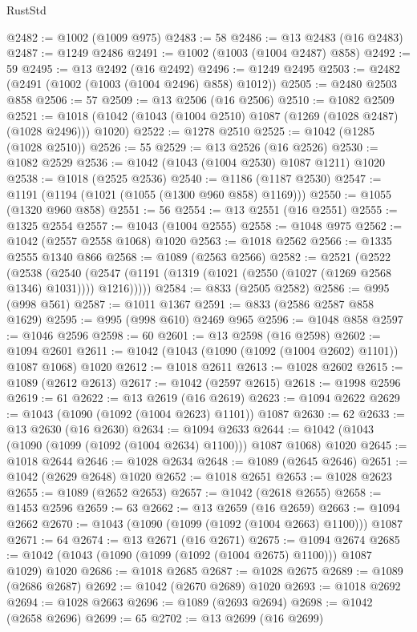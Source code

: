 \begin{lexlean}{RustStd}
\begin{coremodule}
{\begin{coremodule}
{{{{{{{{{{{{{{{{{{{{{{{{{{@2482 := @1002 (@1009 @975)
@2483 := 58
@2486 := @13 @2483 (@16 @2483)
@2487 := @1249 @2486
@2491 := @1002 (@1003 (@1004 @2487) @858)
@2492 := 59
@2495 := @13 @2492 (@16 @2492)
@2496 := @1249 @2495
@2503 := @2482 (@2491 (@1002 (@1003 (@1004 @2496) @858) @1012))
@2505 := @2480 @2503 @858
@2506 := 57
@2509 := @13 @2506 (@16 @2506)
@2510 := @1082 @2509
@2521 := @1018 (@1042 (@1043 (@1004 @2510) @1087 (@1269 (@1028 @2487) (@1028 @2496))) @1020)
@2522 := @1278 @2510
@2525 := @1042 (@1285 (@1028 @2510))
@2526 := 55
@2529 := @13 @2526 (@16 @2526)
@2530 := @1082 @2529
@2536 := @1042 (@1043 (@1004 @2530) @1087 @1211) @1020
@2538 := @1018 (@2525 @2536)
@2540 := @1186 (@1187 @2530)
@2547 := @1191 (@1194 (@1021 (@1055 (@1300 @960 @858) @1169)))
@2550 := @1055 (@1320 @960 @858)
@2551 := 56
@2554 := @13 @2551 (@16 @2551)
@2555 := @1325 @2554
@2557 := @1043 (@1004 @2555)
@2558 := @1048 @975
@2562 := @1042 (@2557 @2558 @1068) @1020
@2563 := @1018 @2562
@2566 := @1335 @2555 @1340 @866
@2568 := @1089 (@2563 @2566)
@2582 := @2521
    (@2522
      (@2538
        (@2540 (@2547 (@1191 (@1319 (@1021 (@2550 (@1027 (@1269 @2568 @1346) @1031)))) @1216)))))
@2584 := @833 (@2505 @2582)
@2586 := @995 (@998 @561)
@2587 := @1011 @1367
@2591 := @833 (@2586 @2587 @858 @1629)
@2595 := @995 (@998 @610) @2469 @965
@2596 := @1048 @858
@2597 := @1046 @2596
@2598 := 60
@2601 := @13 @2598 (@16 @2598)
@2602 := @1094 @2601
@2611 := @1042 (@1043 (@1090 (@1092 (@1004 @2602) @1101)) @1087 @1068) @1020
@2612 := @1018 @2611
@2613 := @1028 @2602
@2615 := @1089 (@2612 @2613)
@2617 := @1042 (@2597 @2615)
@2618 := @1998 @2596
@2619 := 61
@2622 := @13 @2619 (@16 @2619)
@2623 := @1094 @2622
@2629 := @1043 (@1090 (@1092 (@1004 @2623) @1101)) @1087
@2630 := 62
@2633 := @13 @2630 (@16 @2630)
@2634 := @1094 @2633
@2644 := @1042 (@1043 (@1090 (@1099 (@1092 (@1004 @2634) @1100))) @1087 @1068) @1020
@2645 := @1018 @2644
@2646 := @1028 @2634
@2648 := @1089 (@2645 @2646)
@2651 := @1042 (@2629 @2648) @1020
@2652 := @1018 @2651
@2653 := @1028 @2623
@2655 := @1089 (@2652 @2653)
@2657 := @1042 (@2618 @2655)
@2658 := @1453 @2596
@2659 := 63
@2662 := @13 @2659 (@16 @2659)
@2663 := @1094 @2662
@2670 := @1043 (@1090 (@1099 (@1092 (@1004 @2663) @1100))) @1087
@2671 := 64
@2674 := @13 @2671 (@16 @2671)
@2675 := @1094 @2674
@2685 := @1042 (@1043 (@1090 (@1099 (@1092 (@1004 @2675) @1100))) @1087 @1029) @1020
@2686 := @1018 @2685
@2687 := @1028 @2675
@2689 := @1089 (@2686 @2687)
@2692 := @1042 (@2670 @2689) @1020
@2693 := @1018 @2692
@2694 := @1028 @2663
@2696 := @1089 (@2693 @2694)
@2698 := @1042 (@2658 @2696)
@2699 := 65
@2702 := @13 @2699 (@16 @2699)
}}}}}}}}}}}}}}}}}}}}}}}}}}
\end{coremodule}}
\end{coremodule}
\end{lexlean}
